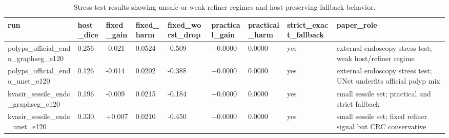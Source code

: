 \begin{table}[t]
\centering
\small
\caption{Stress-test results showing unsafe or weak refiner regimes and host-preserving fallback behavior.}
\label{tab:stress_negative_results}
\begin{tabular}{lllllllll}
\toprule
run & host\_dice & fixed\_gain & fixed\_harm & fixed\_worst\_drop & practical\_gain & practical\_harm & strict\_exact\_fallback & paper\_role \\
\midrule
polyps\_official\_endo\_graphseg\_e120 & 0.256 & -0.021 & 0.0524 & -0.509 & +0.0000 & 0.0000 & yes & external endoscopy stress test; weak host/refiner regime \\
polyps\_official\_endo\_unet\_e120 & 0.126 & -0.014 & 0.0202 & -0.388 & +0.0000 & 0.0000 & yes & external endoscopy stress test; UNet underfits official polyp mix \\
kvasir\_sessile\_endo\_graphseg\_e120 & 0.196 & -0.009 & 0.0215 & -0.184 & +0.0000 & 0.0000 & yes & small sessile set; practical and strict fallback \\
kvasir\_sessile\_endo\_unet\_e120 & 0.330 & +0.007 & 0.0210 & -0.450 & +0.0000 & 0.0000 & yes & small sessile set; fixed refiner signal but CRC conservative \\
\bottomrule
\end{tabular}
\end{table}
